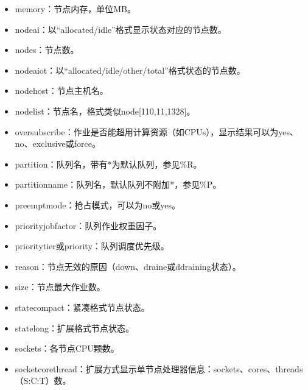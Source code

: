 \documentclass[a4paper,12pt,english]{sphinxmanual}
\begin{document}
\begin{itemize}
\begin{itemize}
\begin{itemize}
\item {} 
\sphinxAtStartPar
memory：节点内存，单位MB。

\item {} 
\sphinxAtStartPar
nodeai：以“allocated/idle”格式显示状态对应的节点数。

\item {} 
\sphinxAtStartPar
nodes：节点数。

\item {} 
\sphinxAtStartPar
nodeaiot：以“allocated/idle/other/total”格式状态的节点数。

\item {} 
\sphinxAtStartPar
nodehost：节点主机名。

\item {} 
\sphinxAtStartPar
nodelist：节点名，格式类似node{[}1\sphinxhyphen{}10,11,13\sphinxhyphen{}28{]}。

\item {} 
\sphinxAtStartPar
oversubscribe：作业是否能超用计算资源（如CPUs），显示结果可以为yes、no、exclusive或force。

\item {} 
\sphinxAtStartPar
partition：队列名，带有*为默认队列，参见\%R。

\item {} 
\sphinxAtStartPar
partitionname：队列名，默认队列不附加*，参见\%P。

\item {} 
\sphinxAtStartPar
preemptmode：抢占模式，可以为no或yes。

\item {} 
\sphinxAtStartPar
priorityjobfactor：队列作业权重因子。

\item {} 
\sphinxAtStartPar
prioritytier或priority：队列调度优先级。

\item {} 
\sphinxAtStartPar
reason：节点无效的原因（down、draine或ddraining状态）。

\item {} 
\sphinxAtStartPar
size：节点最大作业数。

\item {} 
\sphinxAtStartPar
statecompact：紧凑格式节点状态。

\item {} 
\sphinxAtStartPar
statelong：扩展格式节点状态。

\item {} 
\sphinxAtStartPar
sockets：各节点CPU颗数。

\item {} 
\sphinxAtStartPar
socketcorethread：扩展方式显示单节点处理器信息：sockets、cores、threads（S:C:T）数。


\end{itemize}
\end{itemize}
\end{itemize}
\end{document}
